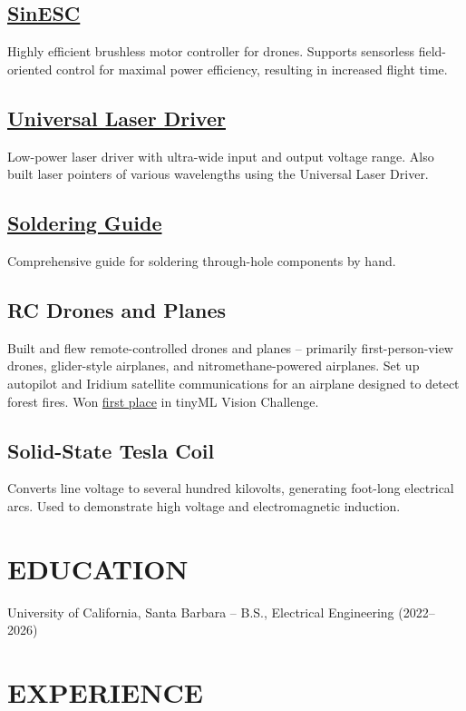 	\subsection{\href{https://github.com/SAR-mango/SinESC}{SinESC}}
	Highly efficient brushless motor controller for drones. Supports sensorless field-oriented control for maximal power efficiency, resulting in increased flight time.
	\subsection{\href{https://github.com/SAR-mango/Universal-Laser-Driver}{Universal Laser Driver}}
	Low-power laser driver with ultra-wide input and output voltage range. Also built laser pointers of various wavelengths using the Universal Laser Driver.
	\subsection{\href{https://github.com/SAR-mango/soldering-guide/blob/main/Soldering_Guide.pdf}{Soldering Guide}}
	Comprehensive guide for soldering through-hole components by hand.
	\subsection{RC Drones and Planes}
	Built and flew remote-controlled drones and planes -- primarily first-person-view drones, glider-style airplanes, and nitromethane-powered airplanes. Set up autopilot and Iridium satellite communications for an airplane designed to detect forest fires. Won \href{https://www.hackster.io/team-sol/tinyml-aerial-forest-fire-detection-78ec6b}{first place} in tinyML Vision Challenge.
	\subsection{Solid-State Tesla Coil}
	Converts line voltage to several hundred kilovolts, generating foot-long electrical arcs. Used to demonstrate high voltage and electromagnetic induction.
	\section*{EDUCATION}
	University of California, Santa Barbara -- B.S., Electrical Engineering (2022--2026)
	\section*{EXPERIENCE}
